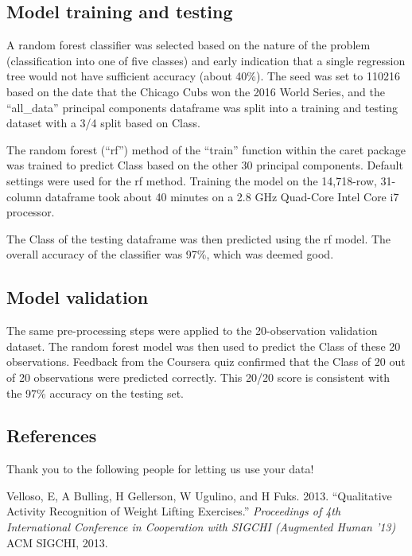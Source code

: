 \documentclass[]{article}
\begin{document}
\hypertarget{model-training-and-testing}{%
\subsection{Model training and
testing}\label{model-training-and-testing}}

A random forest classifier was selected based on the nature of the
problem (classification into one of five classes) and early indication
that a single regression tree would not have sufficient accuracy (about
40\%). The seed was set to 110216 based on the date that the Chicago
Cubs won the 2016 World Series, and the ``all\_data'' principal
components dataframe was split into a training and testing dataset with
a 3/4 split based on Class.

The random forest (``rf'') method of the ``train'' function within the
caret package was trained to predict Class based on the other 30
principal components. Default settings were used for the rf method.
Training the model on the 14,718-row, 31-column dataframe took about 40
minutes on a 2.8 GHz Quad-Core Intel Core i7 processor.

The Class of the testing dataframe was then predicted using the rf
model. The overall accuracy of the classifier was 97\%, which was deemed
good.

\hypertarget{model-validation}{%
\subsection{Model validation}\label{model-validation}}

The same pre-processing steps were applied to the 20-observation
validation dataset. The random forest model was then used to predict the
Class of these 20 observations. Feedback from the Coursera quiz
confirmed that the Class of 20 out of 20 observations were predicted
correctly. This 20/20 score is consistent with the 97\% accuracy on the
testing set.

\hypertarget{references}{%
\subsection{References}\label{references}}

Thank you to the following people for letting us use your data!

\hypertarget{refs}{}
\leavevmode\hypertarget{ref-Velloso2013}{}%
Velloso, E, A Bulling, H Gellerson, W Ugulino, and H Fuks. 2013.
``Qualitative Activity Recognition of Weight Lifting Exercises.''
\emph{Proceedings of 4th International Conference in Cooperation with
SIGCHI (Augmented Human '13)} ACM SIGCHI, 2013.
\end{document}
